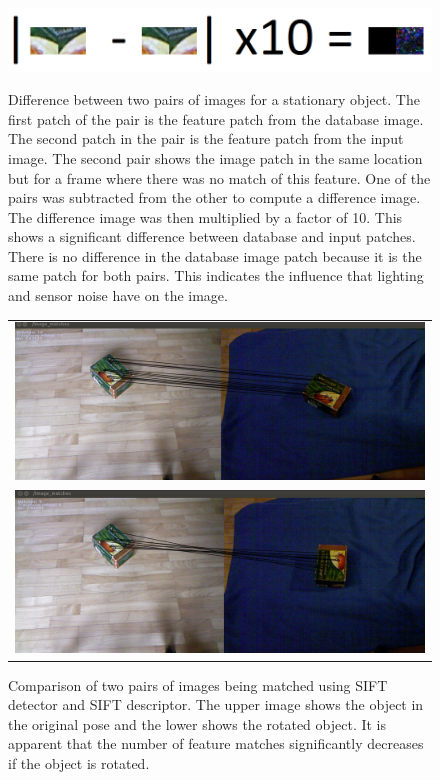 \begin{figure}
\centering

{\includegraphics[width=1\columnwidth]{figures/patches.png}}

\caption[Difference between two pairs of images for a stationary object.]{Difference between two pairs of images for a stationary object. The first patch of the pair is the feature patch from the database image. The second patch in the pair is the feature patch from the input image. The second pair shows the image patch in the same location but for a frame where there was no match of this feature.  One of the pairs was subtracted from the other to compute a difference image.  The difference image was then multiplied by a factor of 10. This shows a significant difference between database and input patches. There is no difference in the database image patch because it is the same patch for both pairs.  This indicates the influence that lighting and sensor noise have on the image.}
\label{fig:patches}
\end{figure}

\begin{figure}
\centering
    \begin{tabular}{c}
 

\includegraphics[width=0.7\columnwidth]{figures/sift-gpu-no-rotation.png}\\
\includegraphics[width=0.7\columnwidth]{figures/siftgpu-rotation.png}\\
    \end{tabular}


\caption[Comparison of two pairs of images being matched using SIFT detector and SIFT descriptor.]{Comparison of two pairs of images being matched using SIFT detector and SIFT descriptor. The upper image shows the object in the original pose and the lower shows the rotated object. It is apparent that the number of feature matches significantly decreases if the object is rotated. }
\label{fig:sift-features}
\end{figure}

